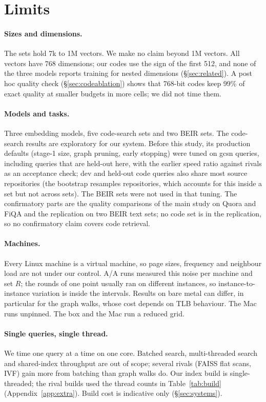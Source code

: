 \section{Limits}\label{sec:limits}
\sloppy

\paragraph{Sizes and dimensions.} The sets hold 7k to 1M vectors. We make no claim beyond 1M vectors. All vectors have 768 dimensions; our codes use the sign of the first 512, and
none of the three models reports training for nested dimensions (\S\ref{sec:related}). A post hoc quality check (\S\ref{sec:codeablation})
shows that 768-bit codes keep 99\% of exact quality at smaller budgets in more cells; we did not time them.

\paragraph{Models and tasks.} Three embedding models, five code-search sets and two BEIR sets. The
code-search results are exploratory for our system. Before this study, its production defaults (stage-1
size, graph pruning, early stopping) were tuned on gcsn queries, including queries that are held-out
here, with the earlier speed ratio against rivals as an acceptance check; dev and held-out code queries
also share most source repositories (the bootstrap resamples repositories, which accounts for this
inside a set but not across sets). The BEIR sets were not used in that tuning. The confirmatory parts are the  quality comparisons of the
main study on Quora and FiQA and the replication on two BEIR text sets; no code set is in the replication, so no
confirmatory claim covers code retrieval.

\paragraph{Machines.} Every Linux machine is a virtual machine, so page sizes, frequency and
neighbour load are not under our control. A/A runs measured this noise per machine and set $R$; the
rounds of one point usually ran on different instances, so instance-to-instance variation is inside
the intervals. Results on bare metal can differ, in particular for the graph walks, whose cost depends
on TLB behaviour. The Mac runs unpinned. The box and the Mac run a reduced grid.

\paragraph{Single queries, single thread.} We time one query at a time on one core. Batched search,
multi-threaded search and shared-index throughput are out of scope; several rivals (FAISS flat
scans, IVF) gain more from batching than graph walks do. Our index build is single-threaded; the
rival builds used the thread counts in Table~\ref{tab:build} (Appendix~\ref{app:extra}). Build cost is indicative only
(\S\ref{sec:systems}).

